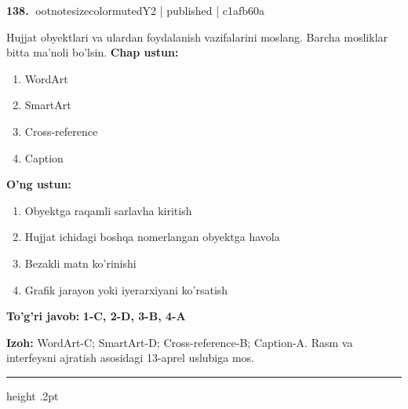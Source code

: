 \documentclass[10pt,a4paper]{article}
\begin{document}
\textbf{\color{ink}138.} {ootnotesizecolor{muted}Y2 | published | c1afb60a}
\par
Hujjat obyektlari va ulardan foydalanish vazifalarini moslang. Barcha mosliklar bitta ma'noli bo'lsin.
\textbf{Chap ustun:}\begin{enumerate}[label=\arabic*),leftmargin=9mm]
\item WordArt
\item SmartArt
\item Cross-reference
\item Caption
\end{enumerate}
\textbf{O'ng ustun:}\begin{enumerate}[label=\Alph*),leftmargin=9mm]
\item Obyektga raqamli sarlavha kiritish
\item Hujjat ichidagi boshqa nomerlangan obyektga havola
\item Bezakli matn ko'rinishi
\item Grafik jarayon yoki iyerarxiyani ko'rsatish
\end{enumerate}
\begin{tcolorbox}[enhanced,breakable,colback=teal!4,colframe=teal!55!black,boxrule=0.45pt,arc=1.2mm,left=2.8mm,right=2.8mm,top=2mm,bottom=2mm]
\textbf{\color{teal}To'g'ri javob:} \textbf{1-C, 2-D, 3-B, 4-A}
\par\smallskip
\textbf{Izoh:} WordArt-C; SmartArt-D; Cross-reference-B; Caption-A. Rasm va interfeysni ajratish asosidagi 13-aprel uslubiga mos.
\end{tcolorbox}
\vspace{2mm}\hrule height .2pt\vspace{2mm}
\end{document}
